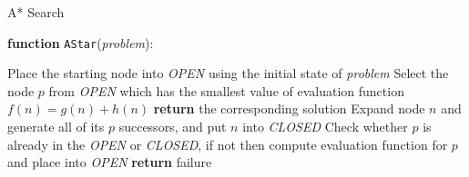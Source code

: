 \documentclass[9pt]{beamer}
\begin{document}
\begin{frame}{A* Search}
\begin{small}

\textbf{function} \texttt{AStar}(\emph{problem}):\\

\begin{minipage}{0.10\linewidth}\vspace{0pt}%
\end{minipage}
\hskip10pt
\begin{minipage}{0.90\linewidth}\vspace{0pt}%
\begin{algorithm}[H]
	Place the starting node into \emph{OPEN} using the initial state of \emph{problem}\;
 	{
  		Select the node $p$ from \emph{OPEN} which has the smallest value of evaluation function $f(n) = g(n) + h(n)$\;
  		{
  		    \textbf{return} the corresponding solution\;
  		}
  		Expand node $n$ and generate all of its $p$ successors, and put $n$ into \emph{CLOSED}\;
  		{
  		    Check whether $p$ is already in the \emph{OPEN} or \emph{CLOSED}, if not then compute evaluation function for $p$ and place into \emph{OPEN}\;
  		}
  	}
  	\textbf{return} failure\;
\end{algorithm}
\end{minipage}

\end{small}
\end{frame}
\end{document}
